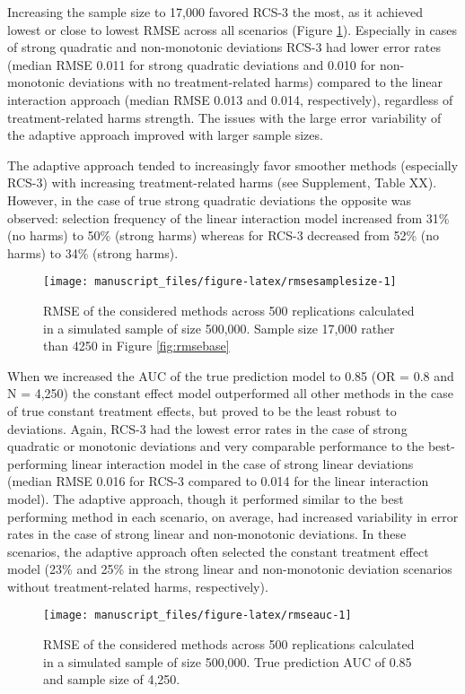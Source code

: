 \documentclass{article}
\begin{document}
Increasing the sample size to 17,000 favored RCS-3 the most, as it
achieved lowest or close to lowest RMSE across all scenarios (Figure
\ref{fig:rmsesamplesize}). Especially in cases of strong quadratic and
non-monotonic deviations RCS-3 had lower error rates (median RMSE 0.011
for strong quadratic deviations and 0.010 for non-monotonic deviations
with no treatment-related harms) compared to the linear interaction
approach (median RMSE 0.013 and 0.014, respectively), regardless of
treatment-related harms strength. The issues with the large error
variability of the adaptive approach improved with larger sample sizes.

The adaptive approach tended to increasingly favor smoother methods
(especially RCS-3) with increasing treatment-related harms (see
Supplement, Table XX). However, in the case of true strong quadratic
deviations the opposite was observed: selection frequency of the linear
interaction model increased from 31\% (no harms) to 50\% (strong harms)
whereas for RCS-3 decreased from 52\% (no harms) to 34\% (strong harms).

\begin{figure}
\texttt{[image: manuscript\_files/figure-latex/rmsesamplesize-1]} \caption{RMSE of the considered methods across 500 replications calculated in a simulated sample of size 500,000. Sample size 17,000 rather than 4250 in Figure \ref{fig:rmsebase}}\label{fig:rmsesamplesize}
\end{figure}

When we increased the AUC of the true prediction model to 0.85 (OR = 0.8
and N = 4,250) the constant effect model outperformed all other methods
in the case of true constant treatment effects, but proved to be the
least robust to deviations. Again, RCS-3 had the lowest error rates in
the case of strong quadratic or monotonic deviations and very comparable
performance to the best-performing linear interaction model in the case
of strong linear deviations (median RMSE 0.016 for RCS-3 compared to
0.014 for the linear interaction model). The adaptive approach, though
it performed similar to the best performing method in each scenario, on
average, had increased variability in error rates in the case of strong
linear and non-monotonic deviations. In these scenarios, the adaptive
approach often selected the constant treatment effect model (23\% and
25\% in the strong linear and non-monotonic deviation scenarios without
treatment-related harms, respectively).

\begin{figure}
\texttt{[image: manuscript\_files/figure-latex/rmseauc-1]} \caption{RMSE of the considered methods across 500 replications calculated in a simulated sample of size 500,000. True prediction AUC of 0.85 and sample size of 4,250.}\label{fig:rmseauc}
\end{figure}
\end{document}
